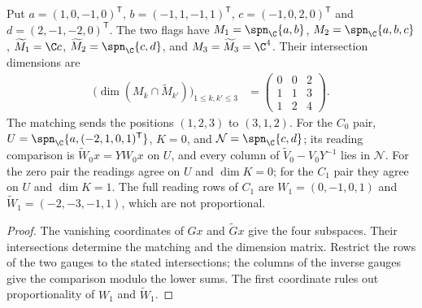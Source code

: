 \begin{lemma}
    \label{lem:asym_example_worked_flags}
    \leanok
    Put $a=(1,0,-1,0)^{\mathsf T}$, $b=(-1,1,-1,1)^{\mathsf T}$,
    $c=(-1,0,2,0)^{\mathsf T}$ and $d=(2,-1,-2,0)^{\mathsf T}$.
    The two flags have
    $M_1=\spn_{\C}\{a,b\}$, $M_2=\spn_{\C}\{a,b,c\}$,
    $\widetilde M_1=\C c$, $\widetilde M_2=\spn_{\C}\{c,d\}$, and
    $M_3=\widetilde M_3=\C^4$. Their intersection dimensions are
    \begin{align}
        \bigl(\dim(M_k\cap\widetilde M_{k'})\bigr)_{1\leq k,k'\leq3}
         & =\begin{pmatrix}0&0&2\\1&1&3\\1&2&4\end{pmatrix}.
    \end{align}
    The matching sends the positions $(1,2,3)$ to $(3,1,2)$.
    For the $C_0$ pair, $U=\spn_{\C}\{a,(-2,1,0,1)^{\mathsf T}\}$,
    $K=0$, and $\mathcal N=\spn_{\C}\{c,d\}$; its reading comparison is
    $\widetilde W_0x=YW_0x$ on $U$, and every column of
    $\widetilde V_0-V_0Y^{-1}$ lies in $\mathcal N$.
    For the zero pair the readings agree on $U$ and $\dim K=0$; for the
    $C_1$ pair they agree on $U$ and $\dim K=1$.
    The full reading rows of $C_1$ are
    $W_1=(0,-1,0,1)$ and $\widetilde W_1=(-2,-3,-1,1)$, which are not proportional.
\end{lemma}

\begin{proof}
    \leanok
    The vanishing coordinates of $Gx$ and $\widetilde Gx$ give the four
    subspaces. Their intersections determine the matching and the dimension
    matrix. Restrict the rows of the two gauges to the stated intersections;
    the columns of the inverse gauges give the comparison modulo the lower
    sums. The first coordinate rules out proportionality of $W_1$ and
    $\widetilde W_1$.
\end{proof}

